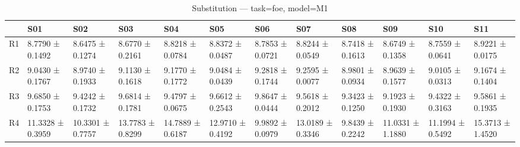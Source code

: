 \begin{table}[htbp]
\centering
\caption{Substitution — task=foe, model=M1}
\label{tab:sub:foe:M1}
\begin{tabular}{llllllllllll}
\toprule
\toprule
 & S01 & S02 & S03 & S04 & S05 & S06 & S07 & S08 & S09 & S10 & S11 \\
\midrule
\midrule
R1 & 8.7790 ± 0.1492 & 8.6475 ± 0.1274 & 8.6770 ± 0.2161 & 8.8218 ± 0.0784 & 8.8372 ± 0.0487 & 8.7853 ± 0.0721 & 8.8244 ± 0.0549 & 8.7418 ± 0.1613 & 8.6749 ± 0.1358 & 8.7559 ± 0.0641 & 8.9221 ± 0.0175 \\
R2 & 9.0430 ± 0.1767 & 8.9740 ± 0.1933 & 9.1130 ± 0.1618 & 9.1770 ± 0.1772 & 9.0484 ± 0.0439 & 9.2818 ± 0.1744 & 9.2595 ± 0.0077 & 8.9801 ± 0.0934 & 8.9639 ± 0.1577 & 9.0105 ± 0.0313 & 9.1674 ± 0.1404 \\
R3 & 9.6850 ± 0.1753 & 9.4242 ± 0.1732 & 9.6814 ± 0.1781 & 9.4797 ± 0.0675 & 9.6612 ± 0.2543 & 9.8647 ± 0.0444 & 9.5618 ± 0.2012 & 9.3423 ± 0.1250 & 9.1923 ± 0.1930 & 9.4322 ± 0.3163 & 9.5861 ± 0.1935 \\
R4 & 11.3328 ± 0.3959 & 10.3301 ± 0.7757 & 13.7783 ± 0.8299 & 14.7889 ± 0.6187 & 12.9710 ± 0.4192 & 9.9892 ± 0.0979 & 13.0189 ± 0.3346 & 9.8439 ± 0.2242 & 11.0331 ± 1.1880 & 11.1994 ± 0.5492 & 15.3713 ± 1.4520 \\
\bottomrule
\end{tabular}\end{table}
